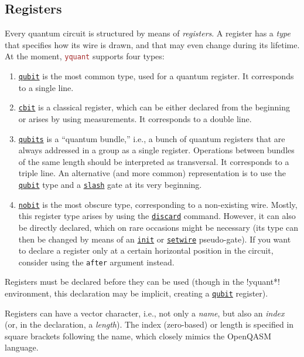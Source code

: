 \documentclass{scrartcl}
\def\pkg#1{\textcolor{brown}{\texttt{#1}}}
\def\gate#1{\hyperref[gate:#1]{\texttt{#1}}}
\def\Yquant{\pkg{yquant}}
\begin{document}
      \subsection{Registers}\label{sec:registers}
         Every quantum circuit is structured by means of \emph{registers}.
         A register has a \emph{type} that specifies how its wire is drawn, and that may even change during its lifetime.
         At the moment, \Yquant{} supports four types:
         \begin{enumerate}
            \item \gate{qubit} is the most common type, used for a quantum register.
               It corresponds to a single line.
            \item \gate{cbit} is a classical register, which can be either declared from the beginning or arises by using measurements.
               It corresponds to a double line.
            \item \gate{qubits} is a ``quantum bundle,'' i.e., a bunch of quantum registers that are always addressed in a group as a single register.
               Operations between bundles of the same length should be interpreted as transversal.
               It corresponds to a triple line.
               An alternative (and more common) representation is to use the \gate{qubit} type and a \gate{slash} gate at its very beginning.
            \item \gate{nobit} is the most obscure type, corresponding to a non\hyp existing wire.
               Mostly, this register type arises by using the \gate{discard} command.
               However, it can also be directly declared, which on rare occasions might be necessary (its type can then be changed by means of an \gate{init} or \gate{setwire} pseudo\hyp gate).
               If you want to declare a register only at a certain horizontal position in the circuit, consider using the \texttt{after} argument instead.
         \end{enumerate}

         Registers must be declared before they can be used (though in the \tex!yquant*! environment, this declaration may be implicit, creating a \gate{qubit} register).

         Registers can have a vector character, i.e., not only a \emph{name}, but also an \emph{index} (or, in the declaration, a \emph{length}).
         The index (zero\hyp based) or length is specified in square brackets following the name, which closely mimics the OpenQASM language.
\end{document}
